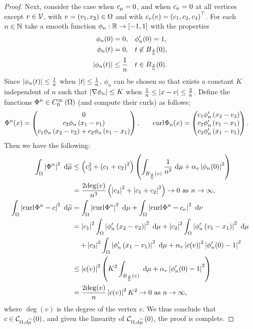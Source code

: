 \begin{proof}
	Next, consider the case when $c_{\mu}=0$, and when $c_{\nu}=0$ at all vertices except $v\in\mathcal{V}$, with $v=\left( v_1, v_2 \right)\in\Omega$ and with $c_{\nu}(v) = \left( c_1, c_2, c_3 \right)^\top$.
	For each $n\in\mathbb{N}$ take a smooth function $\phi_n:\mathbb{R}\rightarrow\left[ -1,1 \right]$ with the properties
	\begin{align*}
		\phi_n(0) = 0,
		&\quad	\phi'_n(0) = 1, \\
		\phi_n(t) = 0, &\quad t\not\in B_{\frac{2}{n}}(0), \\
		\left\lvert \phi_n(t) \right\rvert \leq \frac{1}{n} &\quad t\in B_{\frac{2}{n}}(0).
	\end{align*}
	Since $\left\lvert \phi_n(t) \right\rvert \leq \frac{1}{n}$ when $\left\lvert t \right\rvert\leq\frac{1}{n}$, $\phi_n$ can be chosen so that exists a constant $K$ independent of $n$ such that $\left\lvert \nabla\phi_n \right\rvert \leq K$ when $\frac{1}{n} \leq \left\lvert x-v \right\rvert \leq \frac{2}{n}$.
	Define the functions $\Phi^n\in C^{\infty}_{0}\left( \Omega \right)$ (and compute their curls) as follows;
	\begin{align*}
		\Phi^n(x) = 
		\begin{pmatrix} 
			0 \\ 
			c_3\phi_n\left( x_1 - v_1 \right) \\ 
			c_1\phi_n\left( x_2-v_2 \right) + c_2\phi_n\left( v_1-x_1 \right) 
		\end{pmatrix},
		&\qquad
		\mathrm{curl}_{}\Phi_n(x) =
		\begin{pmatrix}
			c_1\phi'_n\left( x_2-v_2 \right) \\
			c_2\phi'_n\left( v_1-x_1 \right) \\
			c_3\phi'_n\left( x_1-v_1 \right)
		\end{pmatrix}.
	\end{align*}
	Then we have the following:
	\begin{align*}
		\int_{\Omega} \left\lvert  \Phi^n  \right\rvert^2  \ \mathrm{d}\widetilde{\mu}
		&\leq \left( c_3^2 + \left( c_1 + c_2 \right)^2 \right) \left(  \int_{B_{\frac{2}{n}}(v)} \frac{1}{n^2}  \ \mathrm{d}\mu
		+ \alpha_v\left\lvert \phi_n(0) \right\rvert^2  \right) \\
		&= \frac{2\mathrm{deg}(v)}{n^3}\left( \left\lvert c_3 \right\rvert^2 + \left\lvert c_1 + c_2 \right\rvert^2 \right) \rightarrow 0 \ \text{as} \ n \rightarrow\infty, \\
		\int_{\Omega} \left\lvert  \mathrm{curl}_{}\Phi^n - c  \right\rvert^2  \ \mathrm{d}\widetilde{\mu}
		&= \int_{\Omega} \left\lvert  \mathrm{curl}_{}\Phi^n \right\rvert^2  \ \mathrm{d}\mu
		+ \int_{\Omega} \left\lvert  \mathrm{curl}_{}\Phi^n - c_{\nu}  \right\rvert^2  \ \mathrm{d}\nu \\
		&= \left\lvert c_1 \right\rvert^2\int_{\Omega} \left\lvert \phi'_n\left( x_2-v_2 \right) \right\rvert^2  \ \mathrm{d}\mu
		+ \left\lvert c_2 \right\rvert^2\int_{\Omega} \left\lvert \phi'_n\left( v_1-x_1 \right) \right\rvert^2  \ \mathrm{d}\mu \\
		&\quad + \left\lvert c_3 \right\rvert^2\int_{\Omega} \left\lvert \phi'_n\left( x_1-v_1 \right) \right\rvert^2  \ \mathrm{d}\mu
		+ \alpha_v\left\lvert c(v) \right\rvert^2\left\lvert \phi'_n(0)-1 \right\rvert^2 \\
		&\leq \left\lvert c(v) \right\rvert^2 \left(  K^2\int_{B_{\frac{2}{n}}(v)}  \ \mathrm{d}\mu
		+ \alpha_v\left\lvert \phi'_n(0)-1 \right\rvert^2  \right) \\
		&= \frac{2\mathrm{deg}(v)}{n}\left\lvert c(v) \right\rvert^2 K^2 \rightarrow 0 \ \text{as} \ n \rightarrow\infty,
	\end{align*}
	where $\mathrm{\deg}(v)$ is the degree of the vertex $v$.
	We thus conclude that $c\in\mathcal{C}_{ \Omega, \mathrm{d}\widetilde{\mu}}\left( 0 \right)$, and given the linearity of $\mathcal{C}_{ \Omega, \mathrm{d}\widetilde{\mu}}\left( 0 \right)$, the proof is complete.
\end{proof}

